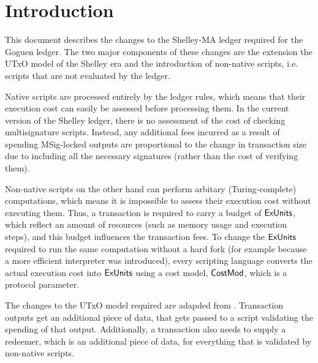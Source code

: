 \section{Introduction}

This document describes the changes to the Shelley-MA ledger required
for the Goguen ledger. The two major components of these changes are
the extension the UTxO model of the Shelley era and the introduction
of non-native scripts, i.e. scripts that are not evaluated by the ledger.

Native scripts are processed entirely by the ledger rules, which means
that their execution cost can easily be assessed before processing
them. In the current version of the Shelley ledger, there is no
assessment of the cost of checking multisignature scripts. Instead,
any additional fees incurred as a result of spending MSig-locked
outputs are proportional to the change in transaction size due to
including all the necessary signatures (rather than the cost of
verifying them).

Non-native scripts on the other hand can perform arbitary
(Turing-complete) computations, which means it is impossible to assess
their execution cost without executing them. Thus, a transaction is
required to carry a budget of $\mathsf{ExUnits}$, which reflect an amount of
resources (such as memory usage and execution steps), and this budget
influences the transaction fees. To change the $\mathsf{ExUnits}$ required to
run the same computation without a hard fork (for example because a
more efficient interpreter was introduced), every scripting language
converts the actual execution cost into $\mathsf{ExUnits}$ using a cost model,
$\mathsf{CostMod}$, which is a protocol parameter.

The changes to the UTxO model required are adapded from
\cite{plutus_eutxo}. Transaction outputs get an additional piece of
data, that gets passed to a script validating the spending of that
output. Additionally, a transaction also needs to supply a redeemer,
which is an additional piece of data, for everything that is validated
by non-native scripts.